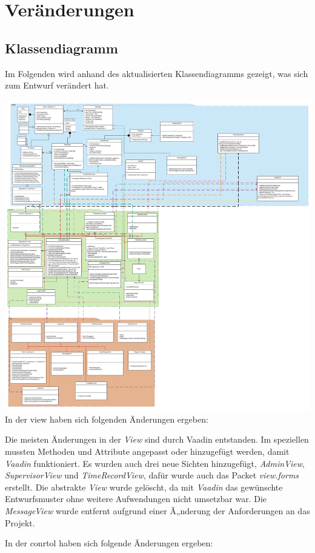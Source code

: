 \section{Veränderungen}
\subsection{Klassendiagramm}
Im Folgenden wird anhand des aktualisierten Klassendiagramms gezeigt, was sich zum Entwurf verändert hat.

\includegraphics{Class-Diagramm_alt.pdf}
In der view haben sich folgenden Änderungen ergeben:

Die meisten Änderungen in der \emph{View} sind durch Vaadin entstanden. 
Im speziellen mussten Methoden und Attribute angepasst oder hinzugefügt werden, 
damit \emph{Vaadin} funktioniert.
Es wurden auch drei neue Sichten hinzugefügt, \emph{AdminView}, \emph{SupervisorView} und \emph{TimeRecordView}, 
dafür wurde auch das Packet \emph{view.forms} erstellt.
Die abstrakte \emph{View} wurde gelöscht, da mit \emph{Vaadin} das gewünschte Entwurfsmuster 
ohne weitere Aufwendungen nicht umsetzbar war.
Die \emph{MessageView} wurde entfernt aufgrund einer Ã„nderung der Anforderungen an das Projekt.

In der conrtol haben sich folgende Änderungen ergeben:

